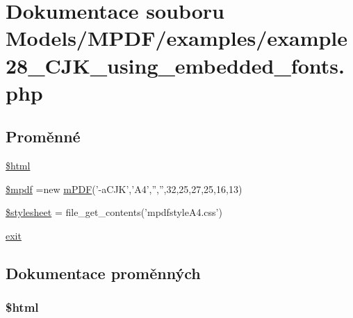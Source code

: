\hypertarget{example28___c_j_k__using__embedded__fonts_8php}{\section{Dokumentace souboru Models/\-M\-P\-D\-F/examples/example28\-\_\-\-C\-J\-K\-\_\-using\-\_\-embedded\-\_\-fonts.php}
\label{example28___c_j_k__using__embedded__fonts_8php}
}
\subsection*{Proměnné}
\begin{DoxyCompactItemize}
\item 
\hyperlink{example28___c_j_k__using__embedded__fonts_8php_a6f96e7fc92441776c9d1cd3386663b40}{\$html}
\item 
\hyperlink{example28___c_j_k__using__embedded__fonts_8php_ad028f81910d6cbab9b184d2214b3a8f8}{\$mpdf} =new \hyperlink{classm_p_d_f}{m\-P\-D\-F}('-\/a\-C\-J\-K','A4','','',32,25,27,25,16,13)
\item 
\hyperlink{example28___c_j_k__using__embedded__fonts_8php_a19e5cf73e817c55a49205e6ec78c88a8}{\$stylesheet} = file\-\_\-get\-\_\-contents('mpdfstyle\-A4.\-css')
\item 
\hyperlink{example28___c_j_k__using__embedded__fonts_8php_a6733eb5f605d09eaede9845835d71c4e}{exit}
\end{DoxyCompactItemize}


\subsection{Dokumentace proměnných}
\hypertarget{example28___c_j_k__using__embedded__fonts_8php_a6f96e7fc92441776c9d1cd3386663b40}{
\subsubsection[{\$html}]{\setlength{\rightskip}{0pt plus 5cm}\$html}}\label{example28___c_j_k__using__embedded__fonts_8php_a6f96e7fc92441776c9d1cd3386663b40}


